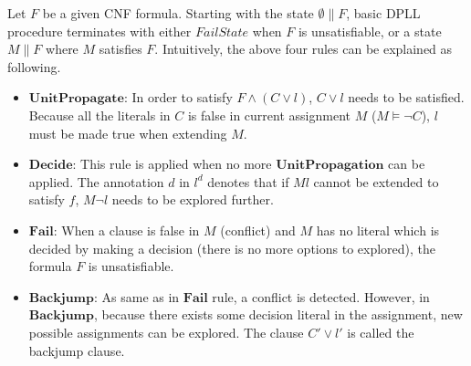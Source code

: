 Let $F$ be a given CNF formula. Starting with the state $\emptyset \parallel F$, basic DPLL procedure terminates with either $FailState$ when $F$ is unsatisfiable, or a state $M \parallel F$ where $M$ satisfies $F$. Intuitively, the above four rules can be explained as following.

\begin{itemize}
\item $\mathbf{UnitPropagate}$: In order to satisfy $F \wedge (C \vee l)$, $C \vee l$ needs to be satisfied. Because all the literals in $C$ is false in current assignment $M$ ($M \models \neg C$), $l$ must be made true when extending $M$.
\item $\mathbf{Decide}$: This rule is applied when no more $\mathbf{UnitPropagation}$ can be applied. The annotation $d$ in $l^d$ denotes that if $Ml$ cannot be extended to satisfy $f$, $M\neg l$ needs to be explored further.
\item $\mathbf{Fail}$: When a clause is false in $M$ (conflict) and $M$ has no literal which is decided by making a decision (there is no more options to explored), the formula $F$ is unsatisfiable.
\item $\mathbf{Backjump}$: As same as in $\mathbf{Fail}$ rule, a conflict is detected. However, in $\mathbf{Backjump}$, because there exists some decision literal in the assignment, new possible assignments can be explored. The clause $C' \vee l'$ is called the backjump clause.
\end{itemize}

